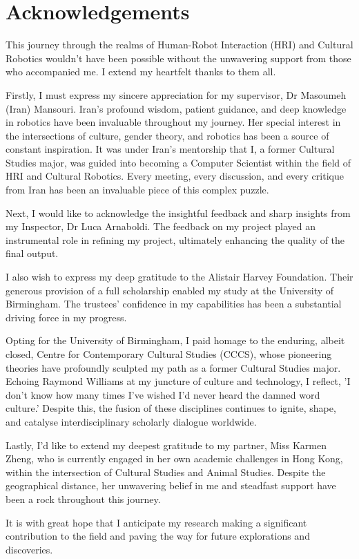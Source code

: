
\chapter*{Acknowledgements}

This journey through the realms of Human-Robot Interaction (HRI) and Cultural Robotics wouldn't have been possible without the unwavering support from those who accompanied me. I extend my heartfelt thanks to them all.

Firstly, I must express my sincere appreciation for my supervisor, Dr Masoumeh (Iran) Mansouri. Iran's profound wisdom, patient guidance, and deep knowledge in robotics have been invaluable throughout my journey. Her special interest in the intersections of culture, gender theory, and robotics has been a source of constant inspiration. It was under Iran’s mentorship that I, a former Cultural Studies major, was guided into becoming a Computer Scientist within the field of HRI and Cultural Robotics. Every meeting, every discussion, and every critique from Iran has been an invaluable piece of this complex puzzle.

Next, I would like to acknowledge the insightful feedback and sharp insights from my Inspector, Dr Luca Arnaboldi. The feedback on my project played an instrumental role in refining my project, ultimately enhancing the quality of the final output. 

I also wish to express my deep gratitude to the Alistair Harvey Foundation. Their generous provision of a full scholarship enabled my study at the University of Birmingham. The trustees' confidence in my capabilities has been a substantial driving force in my progress.

Opting for the University of Birmingham, I paid homage to the enduring, albeit closed, Centre for Contemporary Cultural Studies (CCCS), whose pioneering theories have profoundly sculpted my path as a former Cultural Studies major. Echoing Raymond Williams at my juncture of culture and technology, I reflect, 'I don't know how many times I've wished I'd never heard the damned word culture.' Despite this, the fusion of these disciplines continues to ignite, shape, and catalyse interdisciplinary scholarly dialogue worldwide.

Lastly, I'd like to extend my deepest gratitude to my partner, Miss Karmen Zheng, who is currently engaged in her own academic challenges in Hong Kong, within the intersection of Cultural Studies and Animal Studies. Despite the geographical distance, her unwavering belief in me and steadfast support have been a rock throughout this journey.

It is with great hope that I anticipate my research making a significant contribution to the field and paving the way for future explorations and discoveries.
